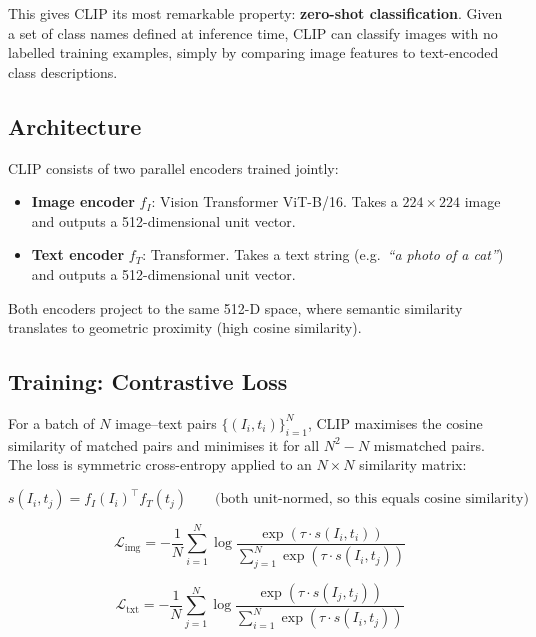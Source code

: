 \documentclass[12pt,a4paper]{article}
\newcommand{\1}{\mathbf{1}}
\begin{document}
This gives CLIP its most remarkable property: \textbf{zero-shot classification}.
Given a set of class names defined at inference time, CLIP can classify images with no labelled training examples, simply by comparing image features to text-encoded class descriptions.

\subsection{Architecture}

CLIP consists of two parallel encoders trained jointly:

\begin{itemize}[leftmargin=1.5em]
  \item \textbf{Image encoder} $f_I$: Vision Transformer ViT-B/16.
        Takes a $224\times224$ image and outputs a 512-dimensional unit vector.
  \item \textbf{Text encoder} $f_T$: Transformer.
        Takes a text string (e.g.\ \textit{``a photo of a cat''}) and outputs a 512-dimensional unit vector.
\end{itemize}

Both encoders project to the same 512-D space, where semantic similarity translates to geometric proximity (high cosine similarity).

\subsection{Training: Contrastive Loss}

For a batch of $N$ image--text pairs $\{(I_i, t_i)\}_{i=1}^N$, CLIP maximises the cosine similarity of matched pairs and minimises it for all $N^2 - N$ mismatched pairs.
The loss is symmetric cross-entropy applied to an $N\times N$ similarity matrix:

\begin{equation}
  s(I_i, t_j) = f_I(I_i)^\top f_T(t_j)
  \qquad \text{(both unit-normed, so this equals cosine similarity)}
  \label{eq:cosine}
\end{equation}

\begin{equation}
  \mathcal{L}_{\text{img}} = -\frac{1}{N}\sum_{i=1}^N \log
    \frac{\exp(\tau \cdot s(I_i,t_i))}{\sum_{j=1}^N \exp(\tau \cdot s(I_i,t_j))}
  \label{eq:loss_img}
\end{equation}

\begin{equation}
  \mathcal{L}_{\text{txt}} = -\frac{1}{N}\sum_{j=1}^N \log
    \frac{\exp(\tau \cdot s(I_j,t_j))}{\sum_{i=1}^N \exp(\tau \cdot s(I_i,t_j))}
  \label{eq:loss_txt}
\end{equation}
\end{document}
